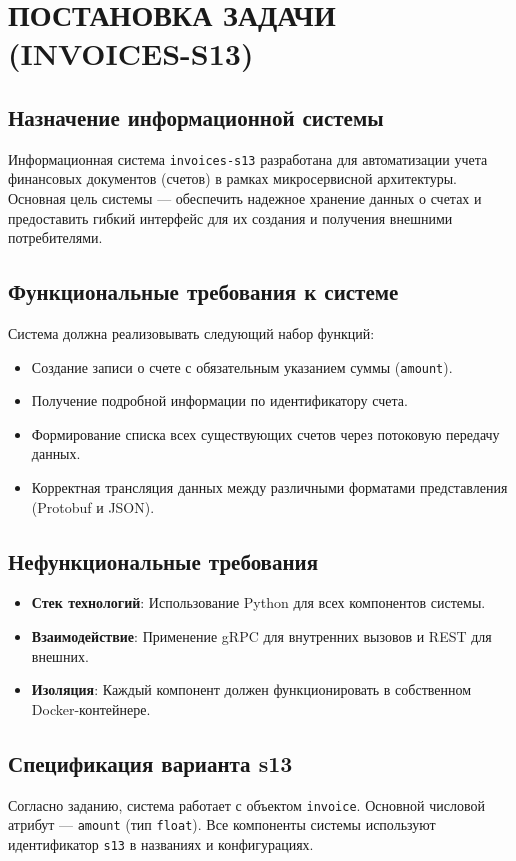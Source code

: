 \section{ПОСТАНОВКА ЗАДАЧИ (INVOICES-S13)}

\subsection{Назначение информационной системы}
Информационная система \texttt{invoices-s13} разработана для автоматизации учета финансовых документов (счетов) в рамках микросервисной архитектуры. Основная цель системы --- обеспечить надежное хранение данных о счетах и предоставить гибкий интерфейс для их создания и получения внешними потребителями.

\subsection{Функциональные требования к системе}
Система должна реализовывать следующий набор функций:
\begin{itemize}
    \item Создание записи о счете с обязательным указанием суммы (\texttt{amount}).
    \item Получение подробной информации по идентификатору счета.
    \item Формирование списка всех существующих счетов через потоковую передачу данных.
    \item Корректная трансляция данных между различными форматами представления (Protobuf и JSON).
\end{itemize}

\subsection{Нефункциональные требования}
\begin{itemize}
    \item \textbf{Стек технологий}: Использование Python для всех компонентов системы.
    \item \textbf{Взаимодействие}: Применение gRPC для внутренних вызовов и REST для внешних.
    \item \textbf{Изоляция}: Каждый компонент должен функционировать в собственном Docker-контейнере.
\end{itemize}

\subsection{Спецификация варианта s13}
Согласно заданию, система работает с объектом \texttt{invoice}. Основной числовой атрибут --- \texttt{amount} (тип \texttt{float}). Все компоненты системы используют идентификатор \texttt{s13} в названиях и конфигурациях.

